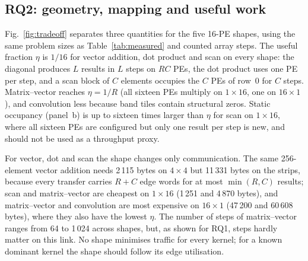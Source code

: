 \subsection{RQ2: geometry, mapping and useful work}
\label{sec:rq2}

Fig.~\ref{fig:tradeoff} separates three quantities for the five 16-PE
shapes, using the same problem sizes as Table~\ref{tab:measured} and counted
array steps. The useful fraction $\eta$ is $1/16$ for vector addition, dot
product and scan on every shape: the diagonal produces $L$ results in $L$
steps on $RC$ PEs, the dot product uses one PE per step, and a scan block of
$C$ elements occupies the $C$ PEs of row~0 for $C$ steps. Matrix--vector
reaches $\eta=1/R$ (all sixteen PEs multiply on $1\times16$, one on
$16\times1$), and convolution less because band tiles contain structural
zeros. Static occupancy (panel~b) is up to sixteen times larger than $\eta$
for scan on $1\times16$, where all sixteen PEs are configured but only one
result per step is new, and should not be used as a throughput proxy.

For vector, dot and scan the shape changes only communication. The same 256-element vector
addition needs 2\,115 bytes on $4\times4$ but 11\,331 bytes on the strips,
because every transfer carries $R+C$ edge words for at most $\min(R,C)$
results; scan and matrix--vector are cheapest on $1\times16$ (1\,251 and
4\,870 bytes), and matrix--vector and convolution are most expensive on
$16\times1$ (47\,200 and 60\,608 bytes), where they also have the lowest
$\eta$. The number of steps of
matrix--vector ranges from 64 to 1\,024 across shapes, but, as shown for
RQ1, steps hardly matter on this link. No shape minimises traffic for every
kernel; for a known dominant kernel the shape should follow its edge
utilisation.


